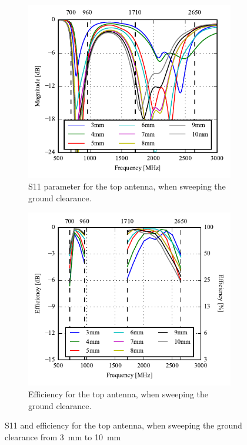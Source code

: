\begin{figure}[htbp]
   \begin{subfigure}[b]{0.49\linewidth}
        \centering
        \includegraphics{img/tech_sol/monopole/5mm/s11_5mm}
        \caption{S11 parameter for the top antenna, when sweeping the ground clearance.}
        \label{fig:s11_mono_sim_5mm}
    \end{subfigure}
    \hfill
    \begin{subfigure}[b]{0.49\linewidth}
        \centering
        \includegraphics{img/tech_sol/monopole/5mm/eff_5mm}
        \caption{Efficiency for the top antenna, when sweeping the ground clearance.}
        \label{fig:eff_mono_sim_5mm}
    \end{subfigure}
    \caption{S11 and efficiency for the top antenna, when sweeping the ground clearance from \SI{3}{mm} to \SI{10}{mm}}
    \label{fig:eff_s11_mono_sim_5mm}
\end{figure}

